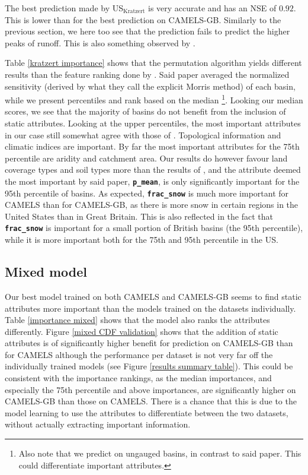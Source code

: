 The best prediction made by US$_\text{Kratzert}$ is very accurate and has an NSE of $0.92$. 
This is lower than for the best prediction on CAMELS-GB. Similarly to the previous 
section, we here too
see that the prediction fails to predict the higher peaks of runoff. 
This is also something observed by \citet{lstm_first_paper}.

Table \ref{kratzert importance} shows that the permutation algorithm yields different 
results than the feature ranking done by \citet{lstm_second_paper}. Said paper 
averaged the normalized sensitivity (derived by what they call the explicit Morris 
method) of each basin, while we present percentiles and rank based on the median
\footnote{Also note that we predict on ungauged basins, in contrast to said paper. 
This could differentiate important attributes.}. 
Looking our median scores, we see that the majority of basins do not benefit 
from the inclusion of static attributes. Looking at the upper percentiles, the 
most important attributes in our case still somewhat agree with those of 
\citet{lstm_second_paper}. Topological information and climatic indices are important. 
By far the most important attributes for the 75th percentile are aridity and 
catchment area. Our results do however favour land coverage types and soil types 
more than the results of \citet{lstm_second_paper}, and the attribute deemed the most important by 
said paper, \textbf{\texttt{p\_mean}}, is only significantly important 
for the 95th percentile of basins. As expected, \textbf{\texttt{frac\_snow}} is 
much more important for CAMELS than for CAMELS-GB, as there is more snow 
in certain regions in the United States than in Great Britain. This is also reflected in the fact that 
\textbf{\texttt{frac\_snow}} is important for a small portion of British basins (the 95th percentile), 
while it is more important both for the 75th and 95th percentile in the US. 

\subsection{Mixed model}
Our best model trained on both CAMELS and CAMELS-GB seems to find static attributes
more important 
than the models trained on the datasets individually. Table \ref{importance mixed} 
shows that the model also ranks the attributes differently. Figure \ref{mixed CDF validation} 
shows that the addition of static attributes is of significantly higher benefit for 
prediction on CAMELS-GB than for CAMELS although the performance per dataset is not 
very far off the individually trained models (see Figure \ref{results summary table}).
This could be consistent with the importance rankings, as 
the median importances, and especially the 75th percentile and above importances, are 
significantly higher on CAMELS-GB than those on CAMELS. There is a chance that this 
is due to the model learning to use the attributes to differentiate between the 
two datasets, without actually extracting important information.

